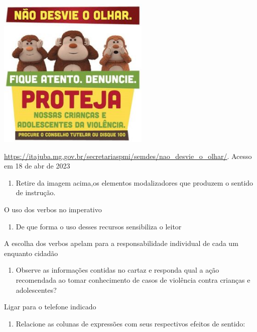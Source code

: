 
\includegraphics[width=2.85536in,height=2.85536in]{./imgSAEB_7_POR/media/image9.png}

\href{https://itajuba.mg.gov.br/secretariaspmi/semdes/nao_desvie_o_olhar/}{\uline{https://itajuba.mg.gov.br/secretariaspmi/semdes/nao\_desvie\_o\_olhar/}}.
Acesso em 18 de abr de 2023

\begin{enumerate}
\def\labelenumi{\arabic{enumi})}
\tightlist
\item
  Retire da imagem acima,os elementos modalizadores que produzem o
  sentido de instrução.
\end{enumerate}

O uso dos verbos no imperativo

\begin{enumerate}
\def\labelenumi{\arabic{enumi})}
\setcounter{enumi}{1}
\tightlist
\item
  De que forma o uso desses recursos sensibiliza o leitor
\end{enumerate}

A escolha dos verbos apelam para a responsabilidade individual de cada
um enquanto cidadão

\begin{enumerate}
\def\labelenumi{\arabic{enumi})}
\setcounter{enumi}{2}
\tightlist
\item
  Observe as informações contidas no cartaz e responda qual a ação
  recomendada ao tomar conhecimento de casos de violência contra
  crianças e adolescentes?
\end{enumerate}

Ligar para o telefone indicado

\begin{enumerate}
\def\labelenumi{\arabic{enumi})}
\setcounter{enumi}{3}
\tightlist
\item
  Relacione as colunas de expressões com seus respectivos efeitos de
  sentido:
\end{enumerate}

